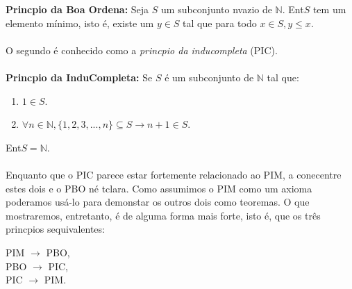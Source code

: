 {\bf Princ\ih pio da Boa Ordena\caoi:} Seja $S$ um subconjunto n\ao vazio de $\mathbb{N}$. Ent\ao $S$ tem um elemento m\'inimo, isto \'e, existe um $y\in S$ tal que para todo $x\in S, y\leq x$.
\\
\\

O segundo \'e conhecido como a {\it princ\ih pio da indu\cao completa} (PIC).
\\
\\

{\bf Princ\ih pio da Indu\cao Completa:} Se $S$ \'e um subconjunto de $\mathbb{N}$ tal que:
\begin{enumerate}[{\bf a)}]
\item $1\in S$.
\item $\forall n\in \mathbb{N}, \{1,2,3,...,n\}\subseteq S \rightarrow n+1\in S$. 
\end{enumerate}
Ent\ao $S=\mathbb{N}$. 
\\
\\

Enquanto que o PIC parece estar fortemente relacionado ao PIM, a conec\cao entre estes dois e o PBO n\ao \'e t\ao clara. Como assumimos o PIM como um axioma poder\ih amos us\'a-lo para demonstar os outros dois como teoremas. O que mostraremos, entretanto, \'e de alguma forma mais forte, isto \'e, que os tr\^es princ\ih pios s\ao equivalentes:
\begin{center}
PIM $\to$ PBO, \\
PBO $\to$ PIC, \\
PIC $\to$ PIM. \\
\end{center}

